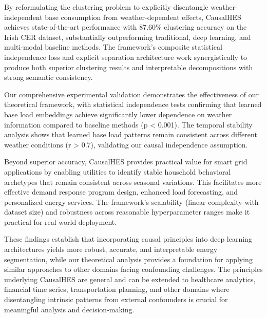 \documentclass[journal]{IEEEtran}
\begin{document}
By reformulating the clustering problem to explicitly disentangle weather-independent base consumption from weather-dependent effects, CausalHES achieves state-of-the-art performance with 87.60\% clustering accuracy on the Irish CER dataset, substantially outperforming traditional, deep learning, and multi-modal baseline methods. The framework's composite statistical independence loss and explicit separation architecture work synergistically to produce both superior clustering results and interpretable decompositions with strong semantic consistency.

Our comprehensive experimental validation demonstrates the effectiveness of our theoretical framework, with statistical independence tests confirming that learned base load embeddings achieve significantly lower dependence on weather information compared to baseline methods (p < 0.001). The temporal stability analysis shows that learned base load patterns remain consistent across different weather conditions (r > 0.7), validating our causal independence assumption.

Beyond superior accuracy, CausalHES provides practical value for smart grid applications by enabling utilities to identify stable household behavioral archetypes that remain consistent across seasonal variations. This facilitates more effective demand response program design, enhanced load forecasting, and personalized energy services. The framework's scalability (linear complexity with dataset size) and robustness across reasonable hyperparameter ranges make it practical for real-world deployment.

These findings establish that incorporating causal principles into deep learning architectures yields more robust, accurate, and interpretable energy segmentation, while our theoretical analysis provides a foundation for applying similar approaches to other domains facing confounding challenges. The principles underlying CausalHES are general and can be extended to healthcare analytics, financial time series, transportation planning, and other domains where disentangling intrinsic patterns from external confounders is crucial for meaningful analysis and decision-making.



\end{document}
